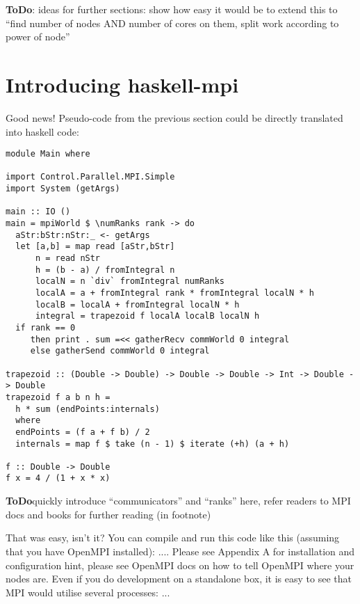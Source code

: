 \documentclass{tmr}
\newcommand{\ToDo}[1]{\textbf{ToDo}{#1}}
\begin{document}
\ToDo: ideas for further sections: show how easy it would be to extend this to ``find number of nodes AND number of cores on them, split work according to power of node''


\section{Introducing haskell-mpi}

Good news! Pseudo-code from the previous section could be directly translated into haskell code:

%

\begin{Verbatim}
module Main where

import Control.Parallel.MPI.Simple
import System (getArgs)

main :: IO ()
main = mpiWorld $ \numRanks rank -> do
  aStr:bStr:nStr:_ <- getArgs
  let [a,b] = map read [aStr,bStr]
      n = read nStr
      h = (b - a) / fromIntegral n
      localN = n `div` fromIntegral numRanks
      localA = a + fromIntegral rank * fromIntegral localN * h
      localB = localA + fromIntegral localN * h
      integral = trapezoid f localA localB localN h
  if rank == 0
     then print . sum =<< gatherRecv commWorld 0 integral
     else gatherSend commWorld 0 integral

trapezoid :: (Double -> Double) -> Double -> Double -> Int -> Double -> Double
trapezoid f a b n h =
  h * sum (endPoints:internals)
  where
  endPoints = (f a + f b) / 2
  internals = map f $ take (n - 1) $ iterate (+h) (a + h)

f :: Double -> Double
f x = 4 / (1 + x * x)
\end{Verbatim}


\ToDo quickly introduce ``communicators'' and ``ranks'' here, refer readers to MPI docs and books for further reading (in footnote)

That was easy, isn't it? You can compile and run this code like this (assuming that you have OpenMPI installed): .... Please see Appendix A for installation and configuration hint, please see OpenMPI docs on how to tell OpenMPI where your nodes are. Even if you do development on a standalone box, it is easy to see that MPI would utilise several processes: ...
\end{document}
